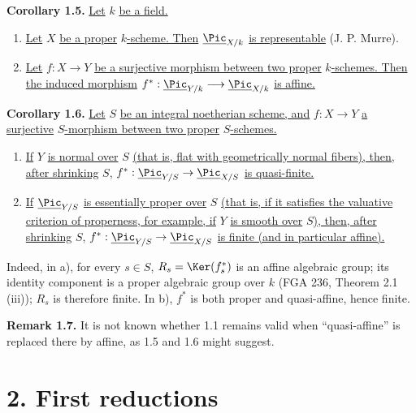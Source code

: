 \textbf{Corollary 1.5.} \uline{Let} \(k\) \uline{be a field.}
\begin{enumerate}[label=\alph*)]
\item \uline{Let} \(X\) \uline{be a proper} \(k\)\uline{-scheme. Then} \(\underline{\Pic}_{X/k}\) \uline{is representable} (J. P. Murre).
\item \uline{Let} \(f:X\to Y\) \uline{be a surjective morphism between two proper} \(k\)\uline{-schemes. Then the induced morphism} \(f^*:\underline{\Pic}_{Y/k}\longrightarrow \underline{\Pic}_{X/k}\) \uline{is affine.}
\end{enumerate}

\textbf{Corollary 1.6.} \uline{Let} \(S\) \uline{be an integral noetherian scheme, and} \(f:X\to Y\) \uline{a surjective} \(S\)\uline{-morphism between two proper} \(S\)\uline{-schemes.}
\begin{enumerate}[label=\alph*)]
\item \uline{If} \(Y\) \uline{is normal over} \(S\) \uline{(that is, flat with geometrically normal fibers), then, after shrinking} \(S\), \(f^*:\underline{\Pic}_{Y/S}\to\underline{\Pic}_{X/S}\) \uline{is quasi-finite.}
\item \uline{If} \(\underline{\Pic}_{Y/S}\) \uline{is essentially proper over} \(S\) \uline{(that is, if it satisfies the valuative criterion of properness, for example, if} \(Y\) \uline{is smooth over} \(S\)\uline{), then, after shrinking} \(S\), \(f^*:\underline{\Pic}_{Y/S}\to\underline{\Pic}_{X/S}\) \uline{is finite (and in particular affine).}
\end{enumerate}

Indeed, in a), for every \(s\in S\), \(R_s=\Ker(f_s^*)\) is an affine algebraic group; its identity component is a proper algebraic group over \(k\) (FGA 236, Theorem 2.1 (iii)); \(R_s\) is therefore finite. In b), \(f^*\) is both proper and quasi-affine, hence finite.

\textbf{Remark 1.7.} It is not known whether 1.1 remains valid when ``quasi-affine'' is replaced there by affine, as 1.5 and 1.6 might suggest.


%
\section*{2. First reductions}


